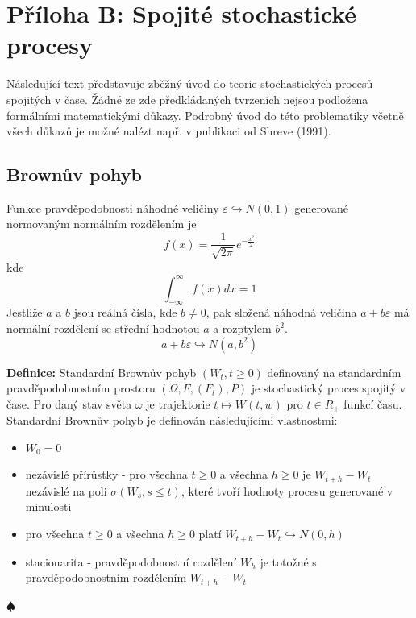 \documentclass[a4paper]{book}
\begin{document}
\section{Příloha B: Spojité stochastické procesy}

Následující text představuje zběžný úvod do teorie stochastických procesů spojitých v čase. Žádné ze zde předkládaných tvrzeních nejsou podložena formálními matematickými důkazy. Podrobný úvod do této problematiky včetně všech důkazů je možné nalézt např. v publikaci od Shreve (1991).

\subsection{Brownův pohyb}

Funkce pravděpodobnosti náhodné veličiny $\varepsilon \hookrightarrow N(0,1)$ generované normovaným normálním rozdělením je
\begin{equation*}
f(x) = \frac{1}{\sqrt{2 \pi}}e^{-\frac{x^2}{2}}
\end{equation*}
kde
\begin{equation*}
\int_{-\infty}^{\infty}f(x) dx = 1
\end{equation*}
Jestliže $a$ a $b$ jsou reálná čísla, kde $b \neq 0$, pak složená náhodná veličina $a + b \varepsilon$ má normální rozdělení se střední hodnotou $a$ a rozptylem $b^2$.
\begin{equation*}
a + b \varepsilon \hookrightarrow N(a, b^2)
\end{equation*}

\noindent \textbf{Definice:} Standardní Brownův pohyb $(W_t, t \ge 0)$ definovaný na standardním pravděpodobnostním prostoru $(\Omega, F, (F_t), P)$ je stochastický proces spojitý v čase. Pro daný stav světa $\omega$ je trajektorie $t \mapsto W(t,w)$ pro $t \in R_{+}$ funkcí času. Standardní Brownův pohyb je definován následujícími vlastnostmi:
\begin{itemize}
\item $W_0 = 0$
\item nezávislé přírůstky - pro všechna $t \ge 0$ a všechna $h \ge 0$ je $W_{t + h} - W_t$ nezávislé na poli $\sigma(W_s, s \le t)$, které tvoří hodnoty procesu generované v minulosti
\item pro všechna $t \ge 0$ a všechna $h \ge 0$ platí $W_{t+h} - W_t \hookrightarrow N(0,h)$
\item stacionarita - pravděpodobnostní rozdělení $W_h$ je totožné s pravděpodobnostním rozdělením $W_{t+h} - W_t$
\end{itemize}
$\spadesuit$\\
\end{document}
